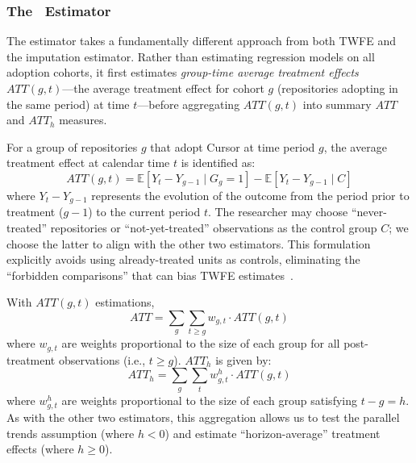 \subsubsection{The~\citet{callaway2021difference} Estimator}
\label{sec:callaway}

The \citet{callaway2021difference} estimator takes a fundamentally different approach from both TWFE and the \citet{borusyak2024revisiting} imputation estimator. 
Rather than estimating regression models on all adoption cohorts, it first estimates \emph{group-time average treatment effects} $ATT(g,t)$---the average treatment effect for cohort $g$ (repositories adopting in the same period) at time $t$---before aggregating $ATT(g,t)$ into summary $ATT$ and $ATT_h$ measures.

For a group of repositories $g$ that adopt Cursor at time period $g$, the average treatment effect at calendar time $t$ is identified as:
\begin{equation}
\label{eq:cursor-cs-att-gt}
ATT(g, t) = \mathbb{E}[Y_t - Y_{g-1} \mid G_g=1] - \mathbb{E}[Y_t - Y_{g-1} \mid C]
\end{equation}
where $Y_t - Y_{g-1}$ represents the evolution of the outcome from the period prior to treatment ($g-1$) to the current period $t$. 
The researcher may choose ``never-treated'' repositories or ``not-yet-treated'' observations as the control group $C$; we choose the latter to align with the other two estimators.
This formulation explicitly avoids using already-treated units as controls, eliminating the ``forbidden comparisons'' that can bias TWFE estimates~\cite{goodman2021difference}.

With $ATT(g, t)$ estimations, \begin{equation}
\label{eq:cs-att}
ATT = \sum_{g} \sum_{t \geq g} w_{g,t} \cdot ATT(g, t)
\end{equation}
where $w_{g,t}$ are weights proportional to the size of each group for all post-treatment observations (i.e., $t \geq g$). $ATT_h$ is given by:
\begin{equation}
\label{eq:cs-agg}
ATT_h  = \sum_{g} \sum_{t} w_{g,t}^h \cdot ATT(g, t)
\end{equation}
where $w_{g,t}^h$ are weights proportional to the size of each group satisfying $t - g = h$. 
As with the other two estimators, this aggregation allows us to test the parallel trends assumption (where $h < 0$) and estimate ``horizon-average'' treatment effects (where $h \geq 0$).

